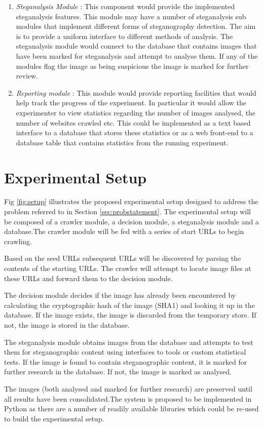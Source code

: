 \documentclass[12pt]{extreport}
\begin{document}
\begin{enumerate}
\item \emph{Steganalysis Module} :
This component would provide the implemented steganalysis features. This module may have a number of steganalysis sub modules that implement different forms of steganography detection. The aim is to provide a uniform interface to different methods of analysis. The steganalysis module would connect to the database that contains images that have been marked for steganalysis and attempt to analyse them. If any of the modules flag the image as being suspicious the image is marked for further review.

\item \emph{Reporting module} :
This module would provide reporting facilities that would help track the progress of the experiment. In particular it would allow the experimenter to view statistics regarding the number of images analysed, the number of websites crawled etc. This could be implemented as a text based interface to a database that stores these statistics or as a web front-end to a database table that contains statistics from the running experiment.
 
\end{enumerate}
\section{Experimental Setup}
\label{sec:expsetup}
Fig \ref{fig:setup} illustrates the proposed experimental setup designed to address the problem referred to in Section \ref{sec:probstatement}. 
The experimental setup will be composed of a crawler module, a decision module, a steganalysis module and a database.The crawler module will be fed with a series of start URLs to begin crawling. 
\par Based on the seed URLs subsequent URLs will be discovered by parsing the contents of the starting URLs. The crawler will attempt to locate image files at these URLs and forward them to the decision module. 
\par The decision module decides if the image has already been encountered by calculating the cryptographic hash of the image (SHA1) and looking it up in the database. If the image exists, the image is discarded from the temporary store. If not, the image is stored in the database.
\par The steganalysis module obtains images from the database and attempts to test them for steganographic content using interfaces to tools or custom statistical tests. If the image is found to contain steganographic content, it is marked for further research in the database. If not, the image is marked as analysed.
\par The images (both analysed and marked for further research) are preserved until all results have been consolidated.The system is proposed to be implemented in Python as there are a number of readily available libraries which could be re-used to build the experimental setup.  
\end{document}
